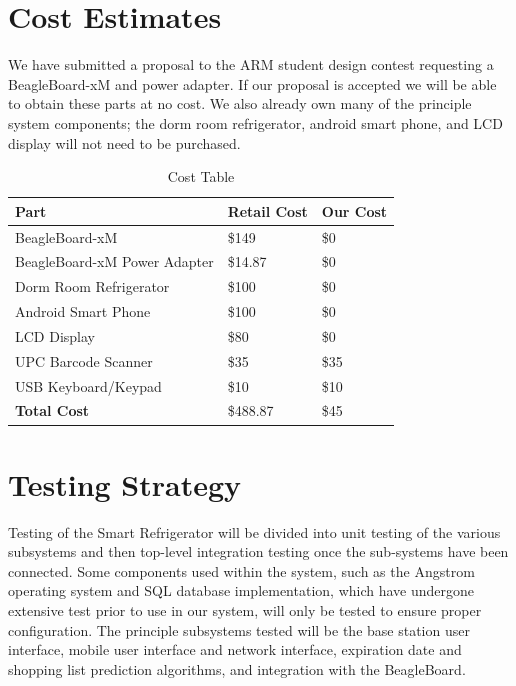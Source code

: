 \documentclass[11pt]{article} %
\begin{document}
\section{Cost Estimates}
We have submitted a proposal to the ARM student design contest requesting a BeagleBoard-xM and power adapter. If our proposal is accepted we will be able to obtain these parts at no cost. We also already own many of the principle system components; the dorm room refrigerator, android smart phone, and LCD display will not need to be purchased.
\begin{table}[h!]
\vspace{0.5cm}
\begin{center}
\caption{Cost Table}
\label{tab:cost}
\begin{tabular}{| p{2.5in} | p{1.75in} |p{1.75in} |}
\hline
Part & Retail Cost & Our Cost \\
\hline
BeagleBoard-xM & \$149 & \$0 \\
\hline
BeagleBoard-xM Power Adapter & \$14.87 & \$0 \\
\hline
Dorm Room Refrigerator & \$100 & \$0 \\
\hline
Android Smart Phone & \$100 & \$0  \\
\hline
LCD Display & \$80  & \$0 \\
\hline
UPC Barcode Scanner & \$35 & \$35 \\
\hline
USB Keyboard/Keypad & \$10 & \$10 \\
\hline
\hline
\textbf{Total Cost} & \$488.87 & \$45 \\
\hline
\end{tabular}
\end{center}
\end{table}

\section{Testing Strategy}
Testing of the Smart Refrigerator will be divided into unit testing of the various subsystems and then top-level integration testing once the sub-systems have been connected. Some components used within the system, such as the Angstrom operating system and SQL database implementation, which have undergone extensive test prior to use in our system, will only be tested to ensure proper configuration. The principle subsystems tested will be the base station user interface, mobile user interface and network interface, expiration date and shopping list prediction algorithms, and integration with the BeagleBoard.
\end{document}
